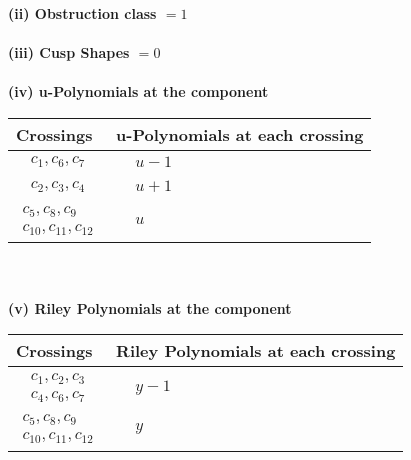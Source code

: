 \documentclass[1p]{elsarticle_modified}
\theoremstyle{definition}
\begin{document}
\flushleft \textbf{(ii) Obstruction class $= 1$}\\~\\
\flushleft \textbf{(iii) Cusp Shapes $= 0$}\\~\\
\newpage\renewcommand{\arraystretch}{1}
\flushleft \textbf{(iv) u-Polynomials at the component}\newline \\
\begin{tabular}{m{50pt}|m{274pt}}
Crossings & \hspace{64pt}u-Polynomials at each crossing \\
\hline $$\begin{aligned}c_{1},c_{6},c_{7}\end{aligned}$$&$\begin{aligned}
&u-1
\end{aligned}$\\
\hline $$\begin{aligned}c_{2},c_{3},c_{4}\end{aligned}$$&$\begin{aligned}
&u+1
\end{aligned}$\\
\hline $$\begin{aligned}c_{5},c_{8},c_{9}\\c_{10},c_{11},c_{12}\end{aligned}$$&$\begin{aligned}
&u
\end{aligned}$\\
\hline
\end{tabular}\\~\\
\newpage\renewcommand{\arraystretch}{1}
\flushleft \textbf{(v) Riley Polynomials at the component}\newline \\
\begin{tabular}{m{50pt}|m{274pt}}
Crossings & \hspace{64pt}Riley Polynomials at each crossing \\
\hline $$\begin{aligned}c_{1},c_{2},c_{3}\\c_{4},c_{6},c_{7}\end{aligned}$$&$\begin{aligned}
&y-1
\end{aligned}$\\
\hline $$\begin{aligned}c_{5},c_{8},c_{9}\\c_{10},c_{11},c_{12}\end{aligned}$$&$\begin{aligned}
&y
\end{aligned}$\\
\hline
\end{tabular}\\~\\
\end{document}
